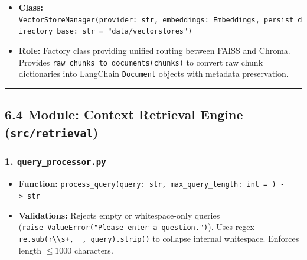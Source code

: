 \documentclass[
]{article}
\providecommand{\tightlist}{%
  \setlength{\itemsep}{0pt}\setlength{\parskip}{0pt}}
\begin{document}
\begin{itemize}
\tightlist
\item
  \textbf{Class:}
  \texttt{VectorStoreManager(\allowbreak provider:\ \allowbreak str,\allowbreak \ \allowbreak embeddings:\ \allowbreak Embeddings,\allowbreak \ \allowbreak persist\_\allowbreak directory\_\allowbreak base:\ \allowbreak str\ \allowbreak =\allowbreak \ \allowbreak "data/\allowbreak vectorstores")\allowbreak }
\item
  \textbf{Role:} Factory class providing unified routing between FAISS
  and Chroma. Provides \texttt{raw\_\allowbreak chunks\_\allowbreak to\_\allowbreak documents(\allowbreak chunks)\allowbreak } to
  convert raw chunk dictionaries into LangChain \texttt{Document}
  objects with metadata preservation.
\end{itemize}

\begin{center}\rule{0.5\linewidth}{0.5pt}\end{center}

\subsection{\texorpdfstring{6.4 Module: Context Retrieval Engine
(\texttt{src/\allowbreak retrieval})}{6.4 Module: Context Retrieval Engine (src/retrieval)}}\label{module-context-retrieval-engine-srcretrieval}

\subsubsection{\texorpdfstring{1.
\texttt{query\_\allowbreak processor.\allowbreak py}}{1. query\_processor.py}}\label{query_processor.py}

\begin{itemize}
\tightlist
\item
  \textbf{Function:}
  \texttt{process\_\allowbreak query(\allowbreak query:\ \allowbreak str,\allowbreak \ \allowbreak max\_\allowbreak query\_\allowbreak length:\ \allowbreak int\ \allowbreak =\allowbreak \ )\allowbreak \ \allowbreak -\textgreater{}\allowbreak \ \allowbreak str}
\item
  \textbf{Validations:} Rejects empty or whitespace-only queries
  (\texttt{raise\ \allowbreak ValueError(\allowbreak "Please\ \allowbreak enter\ \allowbreak a\ \allowbreak question.")\allowbreak }). Uses
  regex
  \texttt{re.\allowbreak sub(\allowbreak r\textquotesingle{}\textbackslash{}\textbackslash{}s+\textquotesingle{},\allowbreak \ \allowbreak \textquotesingle{}\ \allowbreak \textquotesingle{},\allowbreak \ \allowbreak query)\allowbreak .\allowbreak strip(\allowbreak )\allowbreak }
  to collapse internal whitespace. Enforces length \(\le 1000\)
  characters.
\end{itemize}
\end{document}
